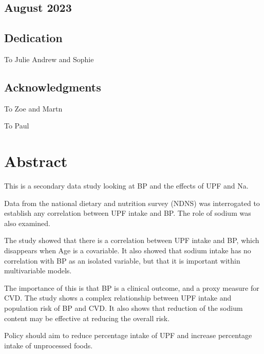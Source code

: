 \documentclass[
]{article}
\begin{document}
\hypertarget{august-2023}{%
\subsection*{August 2023}\label{august-2023}}

\newpage

\hypertarget{dedication}{%
\subsection*{Dedication}\label{dedication}}

To Julie Andrew and Sophie

\newpage

\hypertarget{acknowledgments}{%
\subsection*{Acknowledgments}\label{acknowledgments}}

To Zoe and Martn

To Paul

\newpage

\newpage

\hypertarget{abstract}{%
\section*{Abstract}\label{abstract}}

This is a secondary data study looking at BP and the effects of UPF and
Na.

Data from the national dietary and nutrition survey (NDNS) was
interrogated to establish any correlation between UPF intake and BP. The
role of sodium was also examined.

The study showed that there is a correlation between UPF intake and BP,
which disappears when Age is a covariable. It also showed that sodium
intake has no correlation with BP as an isolated variable, but that it
is important within multivariable models.

The importance of this is that BP is a clinical outcome, and a proxy
measure for CVD. The study shows a complex relationship between UPF
intake and population risk of BP and CVD. It also shows that reduction
of the sodium content may be effective at reducing the overall risk.

Policy should aim to reduce percentage intake of UPF and increase
percentage intake of unprocessed foods.
\end{document}
